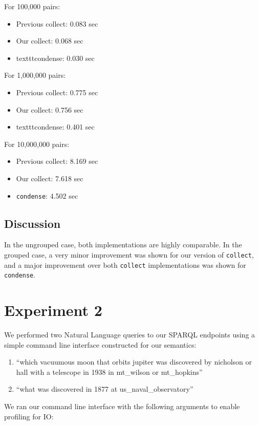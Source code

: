 \documentclass[../main.tex]{subfiles}
\begin{document}
\noindent For 100,000 pairs:
\begin{itemize}
	\item Previous collect: 0.083 sec
	\item Our collect: 0.068 sec
	\item texttt{condense}: 0.030 sec
\end{itemize}

\noindent For 1,000,000 pairs:
\begin{itemize}
	\item Previous collect: 0.775 sec
	\item Our collect: 0.756 sec
	\item texttt{condense}: 0.401 sec
\end{itemize}

\noindent For 10,000,000 pairs:
\begin{itemize}
	\item Previous collect: 8.169 sec
	\item Our collect: 7.618 sec
	\item \texttt{condense}: 4.502 sec
\end{itemize}

\subsection{Discussion}

In the ungrouped case, both implementations are highly comparable.
In the grouped case, a very minor improvement was shown for our version of \texttt{collect},
and a major improvement over both \texttt{collect} implementations was shown for \texttt{condense}.

\section{Experiment 2}

We performed two Natural Language queries to our SPARQL endpoints using a simple command line interface constructed for our semantics:

\begin{enumerate}
	\item ``which vacuumous moon that orbits jupiter was discovered by nicholson or hall with a telescope in 1938 in mt\_wilson or mt\_hopkins''
	\item ``what was discovered in 1877 at us\_naval\_observatory''
\end{enumerate}

We ran our command line interface with the following arguments to enable profiling for IO:
\end{document}
